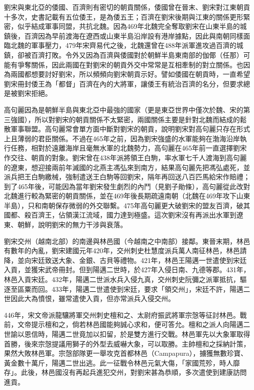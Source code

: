 劉宋與東北亞的倭國、百濟則有密切的朝貢關係，倭國曾在晉末、劉宋對江東朝貢十多次，史書記載有五位倭王，是為倭五王；百濟在劉宋後期與江東的關係更形緊密，似乎結成軍事同盟，共抗北魏。因為469年北魏完全奪取劉宋在山東半島的城鎮後，百濟因為早前渡海在遼西或山東半島沿岸設有港岸據點，因此與南朝同樣面臨北魏的軍事壓力，479年宋齊易代之後，北魏還曾在488年派軍進攻過百濟的城鎮，卻被百濟打敗。令外又因為百濟與倭國對於朝鮮半島東南部的伽倻（任那）可能有爭奪關係，因此兩國在對劉宋的朝貢外交中常常是互相牽制的對立關係。也因為兩國都想要討好劉宋，所以頻頻向劉宋朝貢示好。譬如倭國在朝貢時，一直希望劉宋冊封倭王為「都督」百濟在內的大將軍，讓倭王有統治百濟的名分，但要求總是被劉宋拒絕。

高句麗因為是朝鮮半島與東北亞中最強的國家（更是東亞世界中僅次於魏、宋的第三強國），所以對劉宋的朝貢關係不太緊密，兩國關係主要是針對北魏而結成的鬆散軍事聯盟。高句麗常會單方面中斷對劉宋的朝貢，說明劉宋對高句麗只存在形式上且薄弱的君臣關係。不過在465年之前，因為劉宋強盛的水軍能夠在渤海沿岸執行任務，相對於遠離海岸且毫無水軍的北魏勢力，高句麗在465年前一直選擇劉宋作交往、朝貢的對象。劉宋曾在438年派將領王白駒，率水軍七千人渡海到高句麗的遼東，想迎接兩前年滅國的北燕主馮弘來到南方，結果高句麗先把馮弘處死，並派兵把王白駒繳械，強制遣送王白駒等回劉宋，隔年再回送八百匹馬給宋作賠禮；到了465年後，可能因為當年劉宋發生劇烈的內鬥（見劉子勛條），高句麗從此改對北魏進行較為緊密的朝貢關係，並在469年後長期疏遠南朝（北魏在469年攻下山東半島），只和南朝保存微弱的外交聯繫。475年高句麗更大破劉宋的盟友百濟，破其國都、殺百濟王，佔領漢江流域，國力達到極盛。這次劉宋沒有再派出水軍到遼東、朝鮮，說明劉宋的無力干涉與衰落。

劉宋交州（越南北部）的南邊與林邑國（今越南之中南部）接鄰。東晉末期，林邑有數年的內亂，劉宋建國元年420年，交州刺史杜慧度派兵萬人南征林邑，林邑請降，並向宋廷致送大象、金銀、古貝等禮物。421年，林邑王陽邁一世遣使到宋廷入貢，並獲宋武帝冊封。但到陽邁二世時，於427年入侵日南、九德等郡。431年，林邑入貢宋廷。432年，陽邁二世派水兵入侵九真，交州刺史阮彌之派軍抵抗，驅逐至區粟而回。433年，陽邁二世遣使到宋廷，要求「領交州」，宋廷不許，陽邁二世因此大為憤恨，雖常遣使入貢，但亦常派兵入侵交州。

446年，宋文帝派龍驤將軍交州刺史檀和之、太尉府振武將軍宗愨等征討林邑。戰前，文帝提示檀和之，倘若林邑國能夠誠心求和，便可答允。檀和之派人向陽邁二世諭以恩信時，陽邁二世竟加以扣留，於是雙方進行交戰。林邑軍先以大象軍取得首勝，後來宗愨提議用獅子的外型去威嚇大象，可以取勝。主帥檀和之採納計策，果然大敗林邑軍。宗愨部隊更一舉攻克首都林邑（Campapura），擄獲無數珍寶、黃金數十萬斤，陽邁二世出逃。此一征戰令林邑元氣大傷，「家國荒殄，時人靡存」。此後，林邑國沒有再起兵進犯交州，對劉宋甚為恭順，多次遣使到建康訪問進貢。

